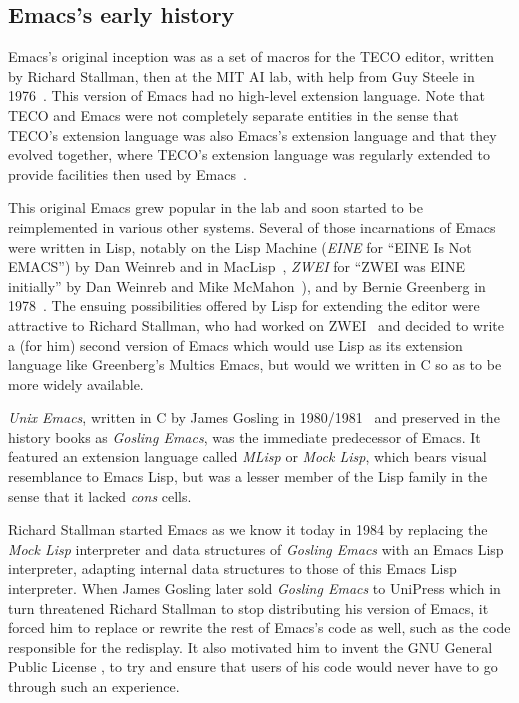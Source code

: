\documentclass[format=acmsmall, review]{acmart}
\newcommand \Elisp {Emacs Lisp}
\begin{document}
\subsection{Emacs's early history}
\label{sec:emacs-early-history}

Emacs's original inception was as a set of macros for the TECO editor,
written by Richard Stallman, then at the MIT AI lab, with help from Guy
Steele in 1976~\cite{Stallman2018-personal}.
This version of Emacs had no high-level extension language.
Note that TECO and Emacs were not completely separate
entities in the sense that TECO's extension language was also Emacs's
extension language and that they evolved together, where TECO's extension
language was regularly extended to provide facilities then used by
Emacs~\cite{https://www.gnu.org/gnu/rms-lisp.html}.

This original Emacs grew popular in the lab and soon started to be
reimplemented in various other systems.  Several of those incarnations of
Emacs were written in Lisp, notably on the Lisp Machine (\emph{EINE} for
``EINE Is Not EMACS'') by Dan Weinreb and in
MacLisp~\cite{Moon1974,Pitman1983}, \emph{ZWEI} for ``ZWEI was EINE
initially'' by Dan Weinreb and Mike McMahon~\cite{Weinreb1979}), and by
Bernie Greenberg in 1978~\cite{Stallman2002}.  The ensuing possibilities
offered by Lisp for extending the editor were attractive to Richard
Stallman, who had worked on ZWEI~\cite{Stallman2018-personal} and decided to
write a (for him) second version of Emacs which would use Lisp as its
extension language like Greenberg's Multics Emacs, but would we written in
C so as to be more widely available.

\emph{Unix Emacs}, written in C by James Gosling in
1980/1981~\cite{Gosling1981} and preserved in the history books as
\emph{Gosling Emacs}, was the immediate predecessor of Emacs.
It featured an extension language called \emph{MLisp} or \emph{Mock Lisp},
which bears visual resemblance to \Elisp{}, but was a lesser member of the
Lisp family in the sense that it lacked \emph{cons} cells.

Richard Stallman started Emacs as we know it today in 1984 by replacing the
\emph{Mock Lisp} interpreter and data structures of \emph{Gosling Emacs}
with an \Elisp{} interpreter, adapting internal data structures to those of
this \Elisp{} interpreter.  When James Gosling later sold \emph{Gosling
  Emacs} to UniPress which in turn threatened Richard Stallman to stop
distributing his version of Emacs, it forced him to replace or rewrite the
rest of Emacs's code as well, such as the code responsible for the
redisplay.  It also motivated him to invent the GNU General Public License
\cite{http://www.free-soft.org/gpl_history/}, to try and ensure that users
of his code would never have to go through such an experience.
\end{document}
